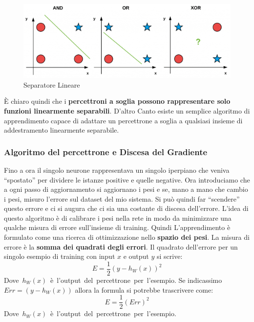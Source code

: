 \begin{figure}[h!]
	\centering
	\includegraphics[width=1\textwidth]{img/bitwise_datasets-1024x365.png}
	\caption{Separatore Lineare}
	\label{SeparatoreLineare}
\end{figure}
È chiaro quindi che i \textbf{percettroni a soglia possono rappresentare solo funzioni linearmente separabili}. D'altro Canto esiste un semplice algoritmo di apprendimento capace di adattare un percettrone a soglia a qualsiasi insieme di addestramento linearmente separabile.
\subsubsection{Algoritmo del percettrone e Discesa del Gradiente}
Fino a ora il singolo neurone rappresentava un singolo iperpiano che veniva ``spostato'' per dividere le istanze positive e quelle negative. Ora introduciamo che a ogni passo di aggiornamento si aggiornano i pesi e se, mano a mano che cambio i pesi, misuro l'errore sul dataset del mio sistema. Si può quindi far ``scendere'' questo errore e ci si augura che ci sia una costante di discesa dell'errore. L'idea di questo algoritmo è di calibrare i pesi nella rete in modo da minimizzare una qualche misura di errore sull'insieme di training. Quindi L'apprendimento è formulato come una ricerca di ottimizzazione nello \textbf{spazio dei pesi}. La misura di errore è la \textbf{somma dei quadrati degli errori}.
Il quadrato dell'errore per un singolo esempio di training con input $x$ e output $y$ si scrive:
\[E=\frac{1}{2}(y-h_W(x))^2\]\mbox{Dove $h_W(x)$ è l'output del percettrone per l'esempio.}
Se indicassimo $Err = (y-h_W(x))$ allora la formula si potrebbe trascrivere come:
\[E=\frac{1}{2}(Err)^2\]\mbox{Dove $h_W(x)$ è l'output del percettrone per l'esempio.}

